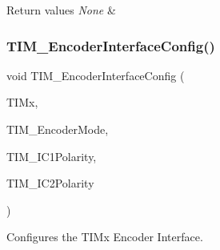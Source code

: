 \begin{DoxyRetVals}{Return values}
{\em None} & \\
\hline
\end{DoxyRetVals}
\mbox{\label{group___t_i_m___private___functions_ga0fc7e76c47a3bd1ba1ebc71427832b51}} 
\subsubsection{\texorpdfstring{TIM\_EncoderInterfaceConfig()}{TIM\_EncoderInterfaceConfig()}}
{\footnotesize\ttfamily void T\+I\+M\+\_\+\+Encoder\+Interface\+Config (\begin{DoxyParamCaption}\item[{\mbox{\hyperlink{struct_t_i_m___type_def}{T\+I\+M\+\_\+\+Type\+Def}} $\ast$}]{T\+I\+Mx,  }\item[{uint16\+\_\+t}]{T\+I\+M\+\_\+\+Encoder\+Mode,  }\item[{uint16\+\_\+t}]{T\+I\+M\+\_\+\+I\+C1\+Polarity,  }\item[{uint16\+\_\+t}]{T\+I\+M\+\_\+\+I\+C2\+Polarity }\end{DoxyParamCaption})}



Configures the T\+I\+Mx Encoder Interface. 


